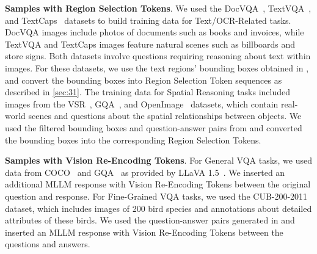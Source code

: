 \textbf{Samples with Region Selection Tokens}. We used the DocVQA~\cite{docvqa},  TextVQA~\cite{textvqa}, and TextCaps~\cite{textcaps} datasets to build training data for Text/OCR-Related tasks. DocVQA images include photos of documents such as books and invoices, while TextVQA and TextCaps images feature natural scenes such as billboards and store signs. Both datasets involve questions requiring reasoning about text within images. For these datasets, we use the text regions' bounding boxes obtained in \cite{shao2024visual}, and convert the bounding boxes into Region Selection Token sequences as described in \cref{sec:31}. The training data for Spatial Reasoning tasks included images from the VSR~\cite{vsr}, GQA~\cite{hudson2019gqa}, and OpenImage~\cite{openimage} datasets, which contain real-world scenes and questions about the spatial relationships between objects. We used the filtered bounding boxes and question-answer pairs from \cite{shao2024visual} and converted the bounding boxes into the corresponding Region Selection Tokens.


\textbf{Samples with Vision Re-Encoding Tokens}. For General VQA tasks, we used data from COCO~\cite{coco} and GQA~\cite{hudson2019gqa} as provided by LLaVA 1.5~\cite{llava15}. We inserted an additional MLLM response with Vision Re-Encoding Tokens between the original question and response. For Fine-Grained VQA tasks, we used the CUB-200-2011~\cite{WahCUB_200_2011} dataset, which includes images of 200 bird species and annotations about detailed attributes of these birds. We used the question-answer pairs generated in \cite{shao2024visual} and inserted an MLLM response with Vision Re-Encoding Tokens between the questions and answers.
